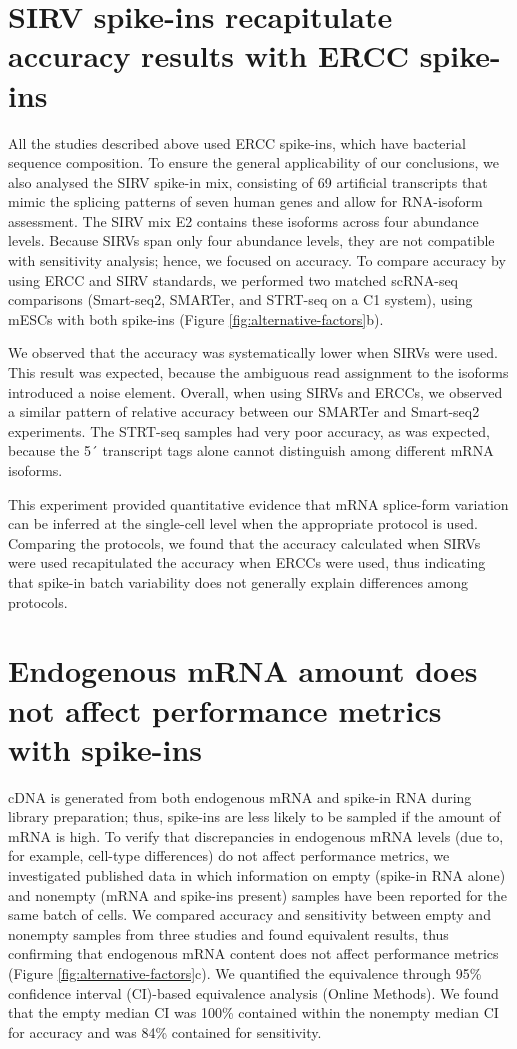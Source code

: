 \section{SIRV spike-ins recapitulate accuracy results with ERCC spike-ins}

All the studies described above used ERCC spike-ins, which have bacterial sequence composition. To ensure the general applicability of our conclusions, we also analysed the SIRV spike-in mix, consisting of 69 artificial transcripts that mimic the splicing patterns of seven human genes and allow for RNA-isoform assessment. The SIRV mix E2 contains these isoforms across four abundance levels. Because SIRVs span only four abundance levels, they are not compatible with sensitivity analysis; hence, we focused on accuracy. To compare accuracy by using ERCC and SIRV standards, we performed two matched scRNA-seq comparisons (Smart-seq2, SMARTer, and STRT-seq on a C1 system), using mESCs with both spike-ins (Figure \ref{fig:alternative-factors}b).

We observed that the accuracy was systematically lower when SIRVs were used. This result was expected, because the ambiguous read assignment to the isoforms introduced a noise element. Overall, when using SIRVs and ERCCs, we observed a similar pattern of relative accuracy between our SMARTer and Smart-seq2 experiments. The STRT-seq samples had very poor accuracy, as was expected, because the 5´ transcript tags alone cannot distinguish among different mRNA isoforms.

This experiment provided quantitative evidence that mRNA splice-form variation can be inferred at the single-cell level when the appropriate protocol is used. Comparing the protocols, we found that the accuracy calculated when SIRVs were used recapitulated the accuracy when ERCCs were used, thus indicating that spike-in batch variability does not generally explain differences among protocols.

\section{Endogenous mRNA amount does not affect performance metrics with spike-ins}

cDNA is generated from both endogenous mRNA and spike-in RNA during library preparation; thus, spike-ins are less likely to be sampled if the amount of mRNA is high. To verify that discrepancies in endogenous mRNA levels (due to, for example, cell-type differences) do not affect performance metrics, we investigated published data in which information on empty (spike-in RNA alone) and nonempty (mRNA and spike-ins present) samples have been reported for the same batch of cells. We compared accuracy and sensitivity between empty and nonempty samples from three studies and found equivalent results, thus confirming that endogenous mRNA content does not affect performance metrics (Figure \ref{fig:alternative-factors}c). We quantified the equivalence through 95\% confidence interval (CI)-based equivalence analysis \cite{Walker2011-qi} (Online Methods). We found that the empty median CI was 100\% contained within the nonempty median CI for accuracy and was 84\% contained for sensitivity.

